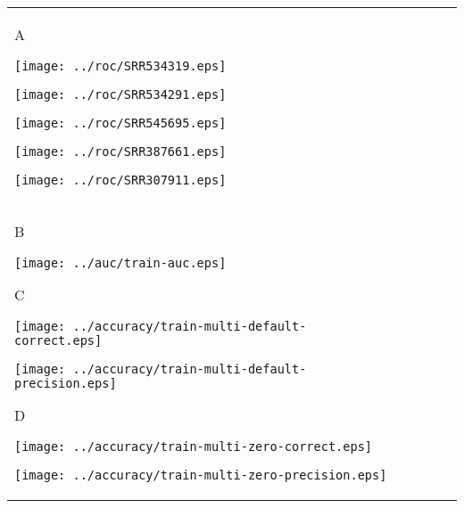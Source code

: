 \documentclass{minimal}
\renewcommand\big{\fontsize{10pt}{10pt}\selectfont}
\begin{document}
\begin{tabular}{lllll}

	\begin{minipage}[t][][t]{0.01cm} {\vspace{-2.00cm} \big\textsf{A}} \end{minipage}
	\begin{minipage}[b][][b]{2.01cm} {\centering \texttt{[image: ../roc/SRR534319.eps]}} \end{minipage} 
	\begin{minipage}[b][][b]{1.81cm} {\centering \texttt{[image: ../roc/SRR534291.eps]}} \end{minipage}
	\begin{minipage}[b][][b]{1.81cm} {\centering \texttt{[image: ../roc/SRR545695.eps]}} \end{minipage}
	\begin{minipage}[b][][b]{1.81cm} {\centering \texttt{[image: ../roc/SRR387661.eps]}} \end{minipage}
	\begin{minipage}[b][][b]{1.81cm} {\centering \texttt{[image: ../roc/SRR307911.eps]}} \end{minipage}\\

	\begin{minipage}[t][][t]{0.04cm} {\vspace{-1.7cm} \big\textsf{B}} \end{minipage}
	\begin{minipage}[b][][b]{1.23cm} {\centering \texttt{[image: ../auc/train-auc.eps]}} \end{minipage} 

	\begin{minipage}[t][][t]{0.12cm} {\vspace{-1.7cm} \big\textsf{C}} \end{minipage}
	\begin{minipage}[b][][b]{1.23cm} {\centering \texttt{[image: ../accuracy/train-multi-default-correct.eps]}} \end{minipage} 
	\begin{minipage}[b][][b]{1.23cm} {\centering \texttt{[image: ../accuracy/train-multi-default-precision.eps]}} \end{minipage}

	\begin{minipage}[t][][t]{0.12cm} {\vspace{-1.7cm} \big\textsf{D}} \end{minipage}
	\begin{minipage}[b][][b]{1.18cm} {\centering \texttt{[image: ../accuracy/train-multi-zero-correct.eps]}} \end{minipage} 
	\begin{minipage}[b][][b]{1.23cm} {\centering \texttt{[image: ../accuracy/train-multi-zero-precision.eps]}} \end{minipage}


\end{tabular}
\end{document}
